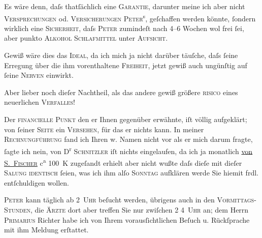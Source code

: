 \pstart
           Es wäre denn, daſs thatſächlich eine \textsc{Garantie}, darunter
               meine ich aber nicht \textsc{Versprechungen} od. \textsc{Versicherungen}{ }\textsc{Peter}\textsuperscript{s}, geſchaffen werden {\pb}könnte,{ }ſondern wirklich eine \textsc{Sicherheit}, daſs \textsc{Peter} zumindeſt nach 4–6 Wochen wol frei{ }ſei, aber punkto \textsc{Alkohol}{ }{\kaufmannsund}{ }\textsc{Schlafmittel} unter \textsc{Aufsicht}.\pend
           
\pstart
           Gewiß wäre dies das \textsc{Ideal}, da ich mich ja nicht darüber
               täuſche, daſs{ }ſeine Erregung über die ihm vorenthaltene \textsc{Freiheit}, jetzt gewiß auch ungünſtig auf{ }ſeine \textsc{Nerven} einwirkt.\pend
           
\pstart
           Aber lieber noch dieſer {\pb}Nachtheil, als das andere {\kaufmannsund} gewiß größere \textsc{risico} eines
               neuerlichen \textsc{Verfalles}!\pend
           
\pstart
           Der \textsc{financielle Punkt} den er Ihnen gegenüber erwähnte, iſt
               völlig aufgeklärt; von{ }ſeiner \textsc{Seite} ein \textsc{Versehen}, für das er nichts kann. In meiner \textsc{Rechnungführung} fand ich Ihren w. Namen nicht vor {\kaufmannsund} als er mich darum fragte,{ }ſagte ich nein, von D\textsuperscript{r}{ }\textsc{Schnitzler}{ }{\pb}iſt nichts eingelaufen, da ich ja monatlich \uline{von \textsc{S. Fischer}} c\textsuperscript{a} 100 K zugeſandt erhielt aber nicht wußte daſs
               dieſe mit dieſer \textsc{Sa{\geminationm}lung
                  identisch}{ }ſeien, was ich ihm alſo \textsc{Sonntag} aufklären werde {\kaufmannsund} Sie hiemit frdl. entſchuldigen
               wollen.\pend
           
\pstart
           \textsc{Peter} kann täglich ab 2 \textsc{Uhr} beſucht werden, übrigens auch
               in den \textsc{Vormittags-Stunden}, die \textsc{Ärzte} dort aber {\pb}treffen Sie nur zwiſchen 2
                  {\kaufmannsund} 4 \textsc{Uhr} an; dem Herrn \textsc{Primarius}{ }Richter habe ich von Ihrem vorausſichtlichen
               Beſuch u. Rückſprache mit ihm Meldung erſtattet.\pend
           

